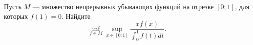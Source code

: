 \documentclass{article}
\begin{document}
Пусть $M$ --- множество непрерывных убывающих функций на отрезке $[0;1]$, для которых $f(1) = 0$. Найдите
$$\inf_{f \in M} \sup_{x \in [0;1]} \frac{xf(x)}{\int_0^1 f(t) dt}.$$
\end{document}
